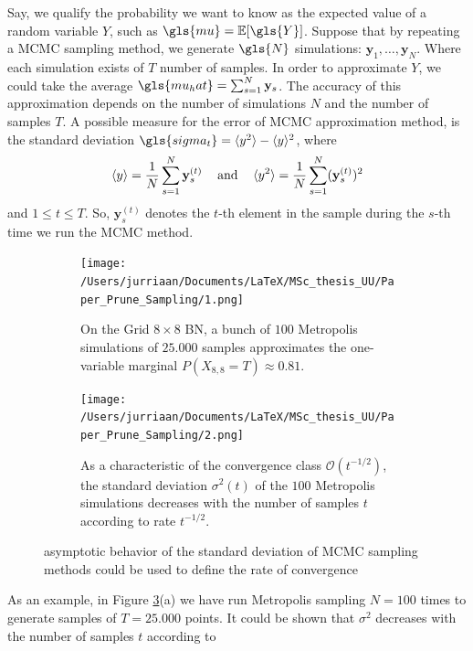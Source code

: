 \documentclass[a4paper, twoside, 11pt]{report}
\theoremstyle{plain}
\theoremstyle{definition}
\theoremstyle{remark}
\newcommand{\E}{{\mathbb E}}
\newcommand{\bfy}{{\mathbf{y}}}
\begin{document}
Say, we qualify the probability we want to know as the expected value of a random variable $Y$, such as $\gls{mu} = \E[\gls{Y}]$. Suppose that by repeating a MCMC sampling method, we generate $\gls{N}$ simulations: $\bfy_1, \ldots , \bfy_N$. Where each simulation exists of $T$ number of samples. In order to approximate $Y$, we could take the average $\gls{mu_hat} = \sum_{s=1}^N \bfy_s$. The accuracy of this approximation depends on the number of simulations $N$ and the number of samples $T$. A possible measure for the error of MCMC approximation method, is the standard deviation $\gls{sigma_t} = \langle y^2 \rangle - \langle y \rangle ^2$, where
\begin{align*}
\centering
\langle y \rangle = \frac{1}{N} \sum_{s=1}^N \bfy_s^{(t)} \hspace{1pc} \text{and} \hspace{1pc}  \langle y^2 \rangle = \frac{1}{N} \sum_{s=1}^N (\bfy_s^{(t)})^2
\end{align*}
and $1 \leq t \leq T$. So, $\bfy_s^{(t)}$ denotes the $t$-th element in the sample during the $s$-th time we run the MCMC method. 
\begin{figure}[b!]
\centering
\begin{subfigure}[t]{0.5\textwidth}
  \centering
  \captionsetup{width = 0.9\textwidth}
  \texttt{[image: /Users/jurriaan/Documents/LaTeX/MSc\_thesis\_UU/Paper\_Prune\_Sampling/1.png]}
  \caption{On the Grid $8 \times 8$ BN, a bunch of $100$ Metropolis simulations of $25.000$ samples approximates the one-variable marginal $P(X_{8,8} = T) \approx 0.81$.}
  \label{sub_1a}
\end{subfigure}%
\begin{subfigure}[t]{0.5\textwidth}
  \centering
  \captionsetup{width = 0.9\textwidth}
  \texttt{[image: /Users/jurriaan/Documents/LaTeX/MSc\_thesis\_UU/Paper\_Prune\_Sampling/2.png]}
  \caption{As a characteristic of the convergence class $\mathcal{O}(t^{-1/2})$, the standard deviation ${\sigma}^2(t)$ of the $100$ Metropolis simulations decreases with the number of samples $t$ according to rate $t^{-1/2}$.}
  \label{sub_1b}
\end{subfigure}
\caption{asymptotic behavior of the standard deviation of MCMC sampling methods could be used to define the rate of convergence}
\label{fig1}
\end{figure}
As an example, in Figure \ref{fig1}(a) we have run Metropolis sampling $N=100$ times to generate samples of $T=25.000$ points. It could be shown \cite{owen2013monte} that $\sigma^2$ decreases with the number of samples $t$ according to
\end{document}
